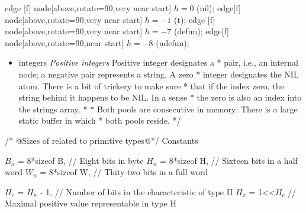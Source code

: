 \documentclass[12pt]{article}
\newenvironment{layout}{\quote\tikzpicture[start chain=going right,x=13pt,y=13pt]\scriptsize}
                       {\endtikzpicture\endquote}
\begin{document}
\begin{code}
\begin{description}
\begin{layout}
     edge [f] node[above,rotate=90,very near start] {\tiny $h=0$} (nil);
     edge[f] node[above,rotate=90,very near start] {\tiny $h=-1$} (t);
     edge [f] node[above,rotate=90,very near start] {\tiny $h=-7$} (defun);
     edge[f] node[above,rotate=90,near start] {\tiny $h=-8$} (ndefun);


\end{layout}
\end{description}
\end{code}

\begin{itemize}
    \item  integers 
    \emph{Positive integers}
Positive integer designates a * 
pair, i.e., an internal node; a negative pair represents a string. A zero
 * integer designates the NIL atom.  There is a bit of trickery to make sure
 * that if the index zero, the string behind it happens to be NIL. In a sense
 * the zero is also an index into the strings array.
 *
 * Both pools are consecutive in memory: There is a large static buffer in which 
 * both pools reside.
 */
\end{itemize}



\begin{code}[literate=
    {=}{$\equiv$ }{1}
    {*}{$\times$}{1}
    {1<<$H_c$}{$2^{H_c}$}{3}
]
/* @Sizes of related to primitive types@*/
Constants {
    $B_n$ = 8*sizeof B,    // Eight bits in byte
    $H_n$ = 8*sizeof H,    // Sixteen bits in a half word
    $W_n$ = 8*sizeof W,    // Thity-two bits in a full word
    
    $H_c$ = $H_n$ - 1,     // Number of bits in the characteristic of type H
    $H_x$ = 1<<$H_c$       // Maximal positive value representable in type H
}
\end{code}
\end{document}
